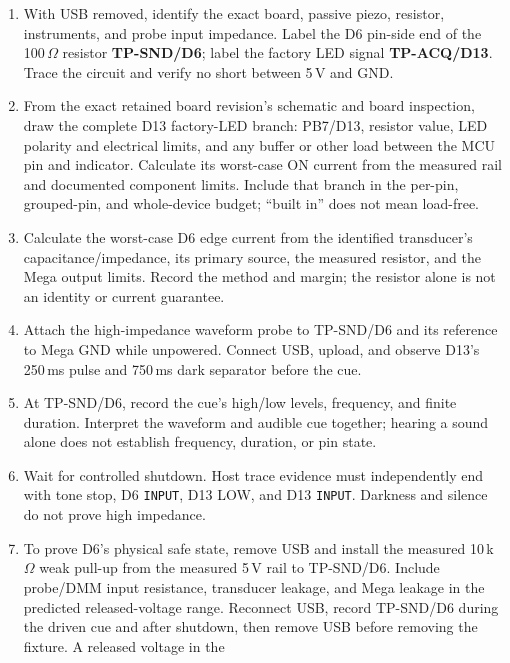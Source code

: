 \documentclass[11pt]{article}
\begin{document}
\begin{enumerate}
    \item With USB removed, identify the exact board, passive piezo, resistor,
          instruments, and probe input impedance. Label the D6 pin-side end of
          the 100\,$\Omega$ resistor \textbf{TP-SND/D6}; label the factory LED
          signal \textbf{TP-ACQ/D13}. Trace the circuit and verify no short
          between 5\,V and GND.
    \item From the exact retained board revision's schematic and board
          inspection, draw the complete D13 factory-LED branch: PB7/D13,
          resistor value, LED polarity and electrical limits, and any buffer
          or other load between the MCU pin and indicator. Calculate its
          worst-case ON current from the measured rail and documented component
          limits. Include that branch in the per-pin, grouped-pin, and
          whole-device budget; ``built in'' does not mean load-free.
    \item Calculate the worst-case D6 edge current from the identified
          transducer's capacitance/impedance, its primary source, the measured
          resistor, and the Mega output limits. Record the method and margin;
          the resistor alone is not an identity or current guarantee.
    \item Attach the high-impedance waveform probe to TP-SND/D6 and its
          reference to Mega GND while unpowered. Connect USB, upload, and
          observe D13's 250\,ms pulse and 750\,ms dark separator before the cue.
    \item At TP-SND/D6, record the cue's high/low levels, frequency, and finite
          duration. Interpret the waveform and audible cue together; hearing a
          sound alone does not establish frequency, duration, or pin state.
    \item Wait for controlled shutdown. Host trace evidence must independently
          end with tone stop, D6 \texttt{INPUT}, D13 LOW, and D13
          \texttt{INPUT}. Darkness and silence do not prove high impedance.
    \item To prove D6's physical safe state, remove USB and install the measured
          10\,k\(\Omega\) weak pull-up from the measured 5\,V rail to
          TP-SND/D6. Include probe/DMM input resistance, transducer leakage,
          and Mega leakage in the predicted released-voltage range. Reconnect
          USB, record TP-SND/D6 during the driven cue and after shutdown, then
          remove USB before removing the fixture. A released voltage in the

\end{enumerate}
\end{document}
